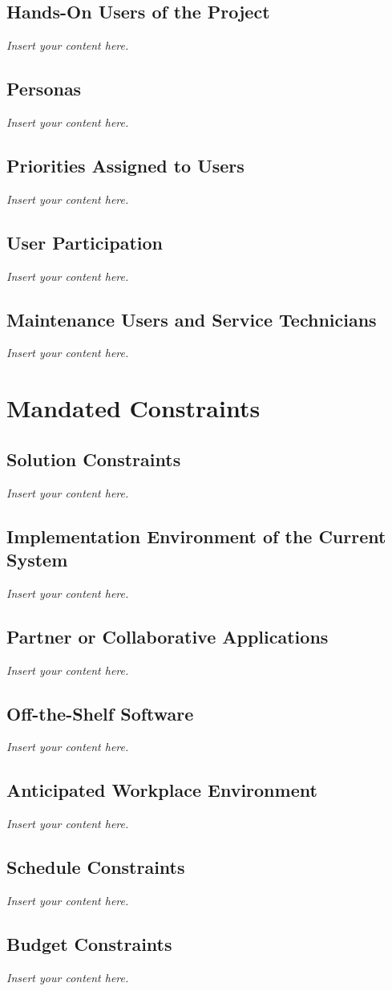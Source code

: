 \documentclass[12pt]{article}
\newcommand{\lips}{\textit{Insert your content here.}}
\begin{document}
\subsection{Hands-On Users of the Project}
\lips
\subsection{Personas}
\lips
\subsection{Priorities Assigned to Users}
\lips
\subsection{User Participation}
\lips
\subsection{Maintenance Users and Service Technicians}
\lips

\section{Mandated Constraints}
\subsection{Solution Constraints}
\lips
\subsection{Implementation Environment of the Current System}
\lips
\subsection{Partner or Collaborative Applications}
\lips
\subsection{Off-the-Shelf Software}
\lips
\subsection{Anticipated Workplace Environment}
\lips
\subsection{Schedule Constraints}
\lips
\subsection{Budget Constraints}
\lips
\end{document}
